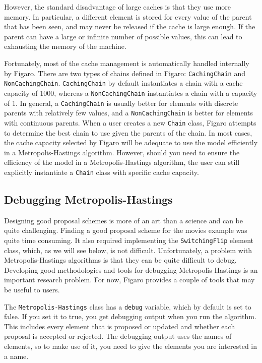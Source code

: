 However, the standard disadvantage of large caches is that they use more memory. In particular, a different element is stored for every value of the parent that has been seen, and may never be released if the cache is large enough. If the parent can have a large or infinite number of possible values, this can lead to exhausting the memory of the machine.

Fortunately, most of the cache management is automatically handled internally by Figaro. There are two types of chains defined in Figaro: \texttt{CachingChain} and \texttt{NonCachingChain}. \texttt{CachingChain} by default instantiates a chain with a cache capacity of 1000, whereas a \texttt{NonCachi\-ngChain} instantiates a chain with a capacity of 1. In general, a \texttt{Caching\-Chain} is usually better for elements with discrete parents with relatively few values, and a \texttt{NonCachingChain} is better for elements with continuous parents. When a user creates a new \texttt{Chain} class, Figaro attempts to determine the best chain to use given the parents of the chain. In most cases, the cache capacity selected by Figaro will be adequate to use the model efficiently in a Metropolis-Hastings algorithm. However, should you need to ensure the efficiency of the model in a Metropolis-Hastings algorithm, the user can still explicitly instantiate a \texttt{Chain} class with specific cache capacity.

\subsection{Debugging Metropolis-Hastings}

Designing good proposal schemes is more of an art than a science and can be quite challenging. Finding a good proposal scheme for the movies example was quite time consuming. It also required implementing the \texttt{SwitchingFlip} element class, which, as we will see below, is not difficult. Unfortunately, a problem with Metropolis-Hastings algorithms is that they can be quite difficult to debug. Developing good methodologies and tools for debugging Metropolis-Hastings is an important research problem. For now, Figaro provides a couple of tools that may be useful to users.

The \texttt{Metropolis-Hastings} class has a \texttt{debug} variable, which by default is set to false. If you set it to true, you get debugging output when you run the algorithm. This includes every element that is proposed or updated and whether each proposal is accepted or rejected. The debugging output uses the names of elements, so to make use of it, you need to give the elements you are interested in a name. 

